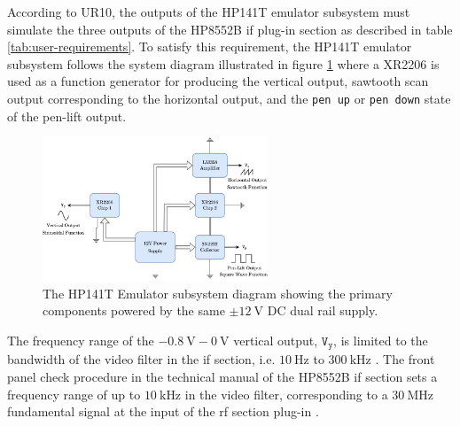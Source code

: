 \documentclass[class=report,11pt,crop=false]{standalone}
\begin{document}
	According to UR10, the outputs of the HP141T emulator subsystem must simulate the three outputs of the HP8552B \acrshort{if} plug-in section as described in table \ref{tab:user-requirements}. To satisfy this requirement, the HP141T emulator subsystem follows the system diagram illustrated in figure \ref{fig:hp141t-emulator-subsystem-diagram} where a XR2206 is used as a function generator for producing the vertical output, sawtooth scan output corresponding to the horizontal output, and the \texttt{pen up} or \texttt{pen down} state of the pen-lift output. 
	
	\begin{figure}[ht!]
		\centering
		\includegraphics[width=0.60\textwidth]{Figures/Methodology/hp141t-emulator-subsystem-diagram}
		\caption{The HP141T Emulator subsystem diagram showing the primary components powered by the same $\pm\SI{12}{\volt}$ DC dual rail supply.}
		\label{fig:hp141t-emulator-subsystem-diagram}
	\end{figure}
	
	The frequency range of the $\SI{-0.8}{\volt}-\SI{0}{\volt}$ vertical output, $\texttt{V}_\texttt{y}$, is limited to the bandwidth of the video filter in the \acrshort{if} section, i.e. $\SI{10}{\hertz}$ to $\SI{300}{\kilo\hertz}$ \cite{hp8552b}. The front panel check procedure in the technical manual of the HP8552B \acrshort{if} section sets a frequency range of up to $\SI{10}{\kilo\hertz}$ in the video filter, corresponding to a $\SI{30}{\mega\hertz}$ fundamental signal at the input of the \acrshort{rf} section plug-in \cite{HP8555A}.  
	
\end{document}
